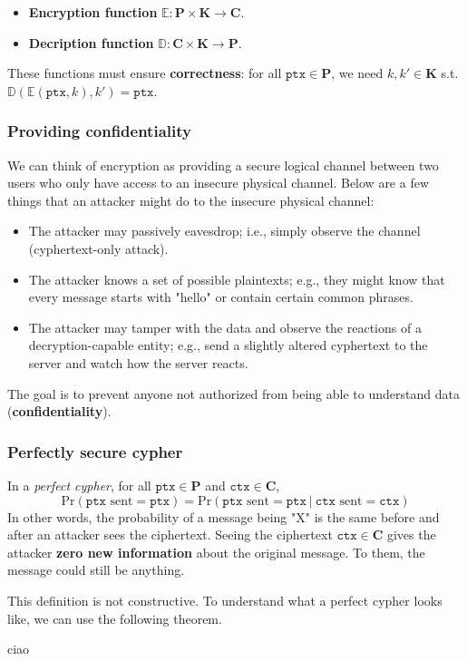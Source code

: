 \begin{tcolorbox}[title = Definition: Functions]
	\begin{itemize}
		\item \textbf{Encryption function} $\mathbb E : \mathbf P \times \mathbf K \to \mathbf C$.
		\item \textbf{Decription function} $\mathbb D : \mathbf C \times \mathbf K \to \mathbf P$.
	\end{itemize}

	These functions must ensure \textbf{correctness}: for all $\texttt{ptx} \in \mathbf P$, we need $k, k' \in \mathbf K$ s.t. $\mathbb D \left( \mathbb E(\texttt{ptx}, k), k' \right) = \texttt{ptx}$.
\end{tcolorbox}

\subsubsection{Providing confidentiality}

We can think of encryption as providing a secure logical channel between two users who only have access to an insecure physical channel. Below are a few things that an attacker might do to the insecure physical channel:

\begin{itemize}
	\item The attacker may passively eavesdrop; i.e., simply observe the channel (cyphertext-only attack).
	\item The attacker knows a set of possible plaintexts; e.g., they might know that every message starts with "hello" or contain certain common phrases.
	\item The attacker may tamper with the data and observe the reactions of a decryption-capable entity; e.g., send a slightly altered cyphertext to the server and watch how the server reacts.
\end{itemize}

The goal is to prevent anyone not authorized from being able to understand data (\textbf{confidentiality}).

\subsubsection{Perfectly secure cypher}

\begin{tcolorbox}[title = Definition: Perfect cypher]
	In a \textit{perfect cypher}, for all $\texttt{ptx} \in \mathbf P$ and $\texttt{ctx} \in \mathbf C$,
	$$
		\mathrm{Pr}(\texttt{ptx} \text{ sent} = \texttt{ptx})
		=
		\mathrm{Pr}(\texttt{ptx} \text{ sent} = \texttt{ptx} \ | \ \texttt{ctx} \text{ sent} = \texttt{ctx})
	$$
	In other words, the probability of a message being "X" is the same before and after an attacker sees the ciphertext. Seeing the ciphertext $\texttt{ctx} \in \mathbf C$ gives the attacker \textbf{zero new information} about the original message. To them, the message could still be anything.
\end{tcolorbox}

This definition is not constructive. To understand what a perfect cypher looks like, we can use the following theorem.

\begin{Theorem}
	ciao
\end{Theorem}
